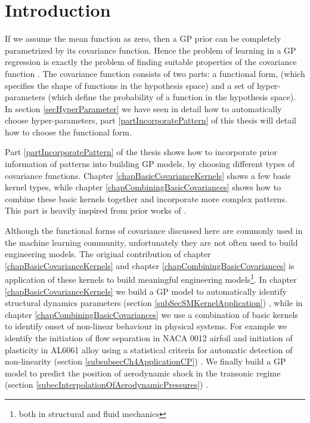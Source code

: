 
\section{Introduction}
If we assume the mean function as zero, then a GP prior can be completely parametrized by its covariance function. Hence the problem of learning in a GP regression is exactly the problem of finding suitable properties of the covariance function \cite{Rasmussen2005}. The covariance function consists of two parts: a functional form, (which specifies the shape of functions in the hypothesis space) and a set of hyper-parameters (which define the probability of a function in the hypothesis space). In section \ref{secHyperParameter} we have seen in detail how to automatically choose hyper-parameters, part \ref{partIncorporatePattern} of this thesis will detail how to choose the functional form. 

Part \ref{partIncorporatePattern} of the thesis shows how to incorporate prior information of patterns into building GP models, by choosing different types of covariance functions. Chapter \ref{chapBasicCovarianceKernels} shows a few basic kernel types, while chapter \ref{chapCombiningBasicCovariances} shows how to combine these basic kernels together and incorporate more complex patterns. This part is heavily inspired from prior works of \cite{duvenaud-thesis-2014, wilson2014thesis, lloyd2014automatic, durrande2001etude}. 

Although the functional forms of covariance discussed here are commonly used in the machine learning community, unfortunately they are not often used to build engineering models. The original contribution of chapter \ref{chapBasicCovarianceKernels} and chapter \ref{chapCombiningBasicCovariances} is application of these kernels to build meaningful engineering models\footnote{both in structural and fluid mechanics}. In chapter \ref{chapBasicCovarianceKernels} we build a GP model to automatically identify structural dynamics parameters (section \ref{subSecSMKernelApplication}) \cite{chiplunkar2017operational}, while in chapter \ref{chapCombiningBasicCovariances} we use a combination of basic kernels to identify onset of non-linear behaviour in physical systems. For example we identify the initiation of flow separation in NACA 0012 airfoil and initiation of plasticity in AL6061 alloy using a statistical criteria for automatic detection of non-linearity (section \ref{subsubsecCh4ApplicationCP}) \cite{chiplunkar:hal-01555401}. We finally build a GP model to predict the position of aerodynamic shock in the transonic regime (section \ref{subecInterpolationOfAerodynamicPressures}) \cite{oatao18004}. 
  
